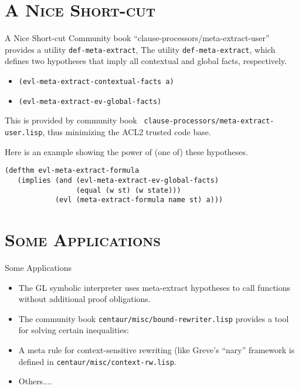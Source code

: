 \section[\scshape Shortcut]{\scshape A Nice Short-cut}
\begin{frame}[fragile] {A Nice Short-cut}
Community book ``clause-processors/meta-extract-user'' provides a utility
\texttt{def-meta-extract}, 
The utility {\tt def-meta-extract}, which defines two
hypotheses that imply all contextual and global facts, respectively.

\begin{itemize}

\item {\tt (evl-meta-extract-contextual-facts a)}

\item {\tt (evl-meta-extract-ev-global-facts)}

\end{itemize}

This is provided by community book {\tt
  clause-processors/meta-extract-user.lisp}, thus minimizing the ACL2
trusted code base.

Here is an example showing the power of (one of) these hypotheses.

\begin{verbatim}
(defthm evl-meta-extract-formula
   (implies (and (evl-meta-extract-ev-global-facts)
                 (equal (w st) (w state)))
            (evl (meta-extract-formula name st) a)))
\end{verbatim}

\end{frame}
\section[\scshape Applications]{\scshape Some Applications}
\begin{frame}[fragile] {Some Applications}

\begin{itemize}

\item The GL symbolic interpreter uses meta-extract hypotheses to
  call functions without additional proof obligations.

\item The community book {\tt centaur/misc/bound-rewriter.lisp}
  provides a tool for solving certain inequalities:

\item A meta rule for context-sensitive rewriting (like Greve's
  ``nary'' framework is defined in {\tt centaur/misc/context-rw.lisp}.

\item Others....

\end{itemize}

\end{frame}
